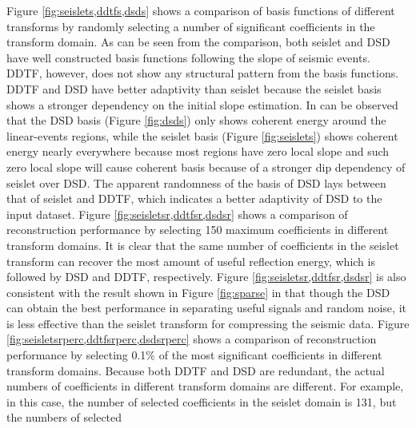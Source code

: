 


Figure \ref{fig:seislets,ddtfs,dsds} shows a comparison of basis functions of different transforms by randomly selecting a number of significant coefficients in the transform domain. As can be seen from the comparison, both seislet and DSD have well constructed basis functions following the slope of seismic events. DDTF, however, does not show any structural pattern from the basis functions. DDTF and DSD have better adaptivity than seislet because the seislet basis shows a stronger dependency on the initial slope estimation. In can be observed that the DSD basis (Figure \ref{fig:dsds}) only shows coherent energy around the linear-events regions, while the seislet basis (Figure \ref{fig:seislets}) shows coherent energy nearly everywhere because most regions have zero local slope and such zero local slope will cause coherent basis because of a stronger dip dependency of seislet over DSD. The apparent randomness of the basis of DSD lays between that of seislet and DDTF, which indicates a better adaptivity of DSD to the input dataset.   Figure \ref{fig:seisletsr,ddtfsr,dsdsr} shows a comparison of reconstruction performance by selecting 150 maximum coefficients in different transform domains. It is clear that the same number of coefficients in the seislet transform can recover the most amount of useful reflection energy, which is followed by DSD and DDTF, respectively. Figure \ref{fig:seisletsr,ddtfsr,dsdsr} is also consistent with the result shown in Figure \ref{fig:sparse} in that though the DSD can obtain the best performance in separating useful signals and random noise, it is less effective than the seislet transform for compressing the seismic data. Figure \ref{fig:seisletsrperc,ddtfsrperc,dsdsrperc} shows a comparison of reconstruction performance by selecting 0.1\% of the most significant coefficients in different transform domains. Because both DDTF and DSD are redundant, the actual numbers of coefficients  in different transform domains are different. For example, in this case, the number of selected coefficients in the seislet domain is 131, but the numbers of selected 